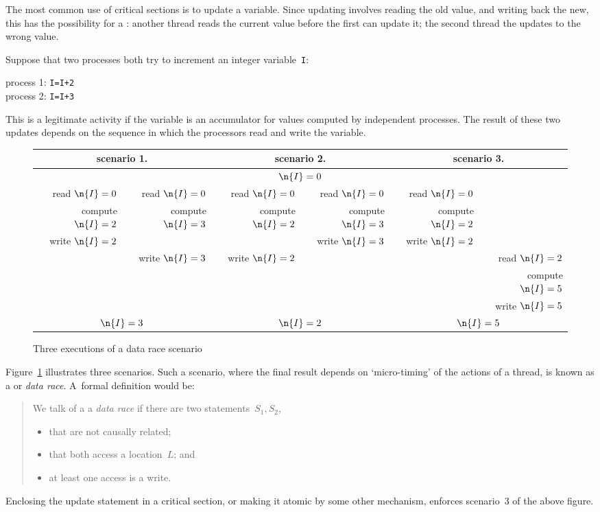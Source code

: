 The most common use of critical sections is to update a variable. Since updating
involves reading the old value, and writing back the new, this has the possibility
for a : another thread reads the current value
before the first can update it; the second thread the updates to the wrong value.

Suppose that two processes both try to increment an integer
variable~\texttt{I}:
\begin{tabbing}
  process 1: \texttt{I=I+2}\\
  process 2: \texttt{I=I+3}
\end{tabbing}
This is a legitimate activity if the variable is an accumulator for
values computed by independent processes.
The result of these two updates
depends on the sequence in which the processors read and
write the variable.

\begin{figure}[ht]
  \begin{tabular}{|rr|rr|rr|}
    \hline
    \multicolumn{2}{|c|}{scenario 1.}& \multicolumn{2}{|c|}{scenario 2.}&
    \multicolumn{2}{|c|}{scenario 3.}\\ \hline
    \multicolumn{6}{|c|}{$\n{I}=0$}\\ \hline
    read $\n{I}=0$&read $\n{I}=0$&
    read $\n{I}=0$&read $\n{I}=0$&
    read $\n{I}=0$& \\
    compute $\n{I}=2$&compute $\n{I}=3$& 
    compute $\n{I}=2$&compute $\n{I}=3$&
    compute $\n{I}=2$& \\
    write $\n{I}=2$& & &write $\n{I}=3$&write $\n{I}=2$& \\
    &write $\n{I}=3$&write $\n{I}=2$& & &read $\n{I}=2$\\
    &&&&&compute $\n{I}=5$\\
    &&&&&write $\n{I}=5$\\
    \hline
    \multicolumn{2}{|c|}{$\n{I}=3$}& \multicolumn{2}{|c|}{$\n{I}=2$}&
    \multicolumn{2}{|c|}{$\n{I}=5$}\\ \hline
  \end{tabular}
  \caption{Three executions of a data race scenario}
  \label{fig:race}
\end{figure}

Figure~\ref{fig:race} illustrates
three scenarios.
Such a scenario,
where the final result depends on `micro-timing' of the actions of a thread,
is known as a  or
\emph{data race}.
A~formal definition would be:
\begin{quotation}
  We talk of a a \emph{data race} if there are two statements~$S_1,S_2$,
  \begin{itemize}
  \item that are not causally related;
  \item that both access a location~$L$; and
  \item at least one access is a write.
  \end{itemize}
\end{quotation}
Enclosing the update statement in a critical section,
or making it atomic by some other mechanism,
enforces scenario~3 of the above figure.

